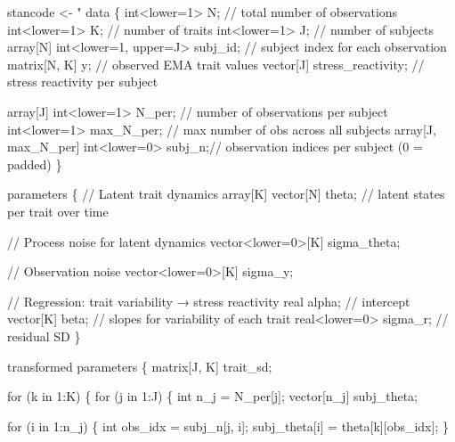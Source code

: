 \documentclass[
  11pt,
  a4paper,
  onecolumn]{article}
\newenvironment{Shaded}{}{}
\newcommand{\NormalTok}[1]{\textcolor[rgb]{0.14,0.16,0.18}{#1}}
\newcommand{\OtherTok}[1]{\textcolor[rgb]{0.44,0.26,0.76}{#1}}
\newcommand{\StringTok}[1]{\textcolor[rgb]{0.01,0.18,0.38}{#1}}
\begin{document}
\begin{Shaded}
\begin{Highlighting}[]
\NormalTok{stancode }\OtherTok{\textless{}{-}} \StringTok{"}
\StringTok{data \{}
\StringTok{  int\textless{}lower=1\textgreater{} N;                          // total number of observations}
\StringTok{  int\textless{}lower=1\textgreater{} K;                          // number of traits}
\StringTok{  int\textless{}lower=1\textgreater{} J;                          // number of subjects}
\StringTok{  array[N] int\textless{}lower=1, upper=J\textgreater{} subj\_id;  // subject index for each observation}
\StringTok{  matrix[N, K] y;                          // observed EMA trait values}
\StringTok{  vector[J] stress\_reactivity;            // stress reactivity per subject}

\StringTok{  array[J] int\textless{}lower=1\textgreater{} N\_per;            // number of observations per subject}
\StringTok{  int\textless{}lower=1\textgreater{} max\_N\_per;                 // max number of obs across all subjects}
\StringTok{  array[J, max\_N\_per] int\textless{}lower=0\textgreater{} subj\_n;// observation indices per subject (0 = padded)}
\StringTok{\}}

\StringTok{parameters \{}
\StringTok{  // Latent trait dynamics}
\StringTok{  array[K] vector[N] theta;               // latent states per trait over time}

\StringTok{  // Process noise for latent dynamics}
\StringTok{  vector\textless{}lower=0\textgreater{}[K] sigma\_theta;}

\StringTok{  // Observation noise}
\StringTok{  vector\textless{}lower=0\textgreater{}[K] sigma\_y;}

\StringTok{  // Regression: trait variability → stress reactivity}
\StringTok{  real alpha;                             // intercept}
\StringTok{  vector[K] beta;                         // slopes for variability of each trait}
\StringTok{  real\textless{}lower=0\textgreater{} sigma\_r;                  // residual SD}
\StringTok{\}}

\StringTok{transformed parameters \{}
\StringTok{  matrix[J, K] trait\_sd;}

\StringTok{  for (k in 1:K) \{}
\StringTok{    for (j in 1:J) \{}
\StringTok{      int n\_j = N\_per[j];}
\StringTok{      vector[n\_j] subj\_theta;}

\StringTok{      for (i in 1:n\_j) \{}
\StringTok{        int obs\_idx = subj\_n[j, i];}
\StringTok{        subj\_theta[i] = theta[k][obs\_idx];}
\StringTok{      \}}


\end{Highlighting}
\end{Shaded}
\end{document}
